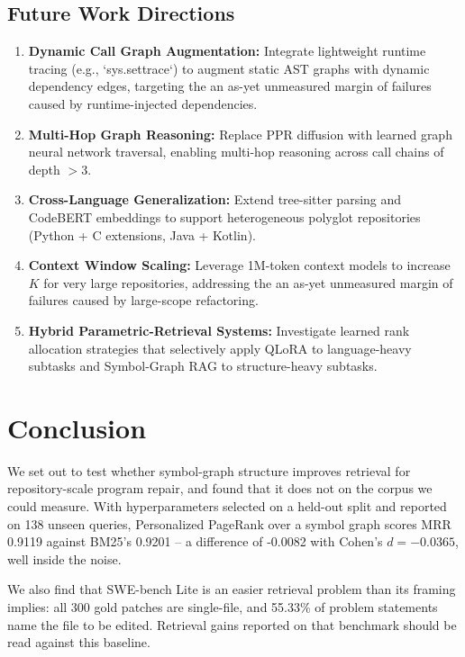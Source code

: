 \documentclass[10pt,journal,compsoc,twocolumn]{IEEEtran}
\begin{document}
\subsection{Future Work Directions}


\begin{enumerate}
  \item \textbf{Dynamic Call Graph Augmentation:} Integrate lightweight runtime tracing (e.g., `sys.settrace`) to augment static AST graphs with dynamic dependency edges, targeting the an as-yet unmeasured margin of failures caused by runtime-injected dependencies.
  \item \textbf{Multi-Hop Graph Reasoning:} Replace PPR diffusion with learned graph neural network traversal, enabling multi-hop reasoning across call chains of depth $> 3$.
  \item \textbf{Cross-Language Generalization:} Extend tree-sitter parsing and CodeBERT embeddings to support heterogeneous polyglot repositories (Python + C extensions, Java + Kotlin).
  \item \textbf{Context Window Scaling:} Leverage 1M-token context models to increase $K$ for very large repositories, addressing the an as-yet unmeasured margin of failures caused by large-scope refactoring.
  \item \textbf{Hybrid Parametric-Retrieval Systems:} Investigate learned rank allocation strategies that selectively apply QLoRA to language-heavy subtasks and Symbol-Graph RAG to structure-heavy subtasks.
\end{enumerate}




\section{Conclusion}


We set out to test whether symbol-graph structure improves retrieval for repository-scale program repair, and found that it does not on the corpus we could measure. With hyperparameters selected on a held-out split and reported on 138 unseen queries, Personalized PageRank over a symbol graph scores MRR 0.9119 against BM25's 0.9201 -- a difference of -0.0082 with Cohen's $d = -0.0365$, well inside the noise.

We also find that SWE-bench Lite is an easier retrieval problem than its framing implies: all 300 gold patches are single-file, and 55.33\% of problem statements name the file to be edited. Retrieval gains reported on that benchmark should be read against this baseline.
\end{document}
